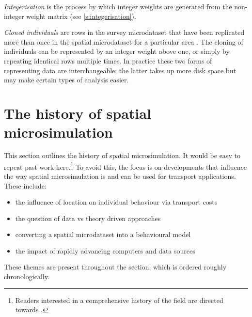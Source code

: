 \documentclass[a4paper, 11pt, twoside]{Thesis}
\begin{document}
\emph{Integerisation} is the process by which integer weights are generated
from the non-integer weight matrix (see \cref{s:integerisation}).

\emph{Cloned individuals}  are rows in the survey microdataset
that have been replicated more than once in the spatial microdataset for a
particular area \citep{Smith2009}.
The cloning of individuals can be represented by an integer
weight above one, or simply by repeating identical rows multiple times. In
practice these two forms of representing data are interchangeable; the latter
takes up more disk space \citep{Holm1996} but may make certain types of analysis
easier.


\section{The history of spatial microsimulation}
\label{s:history}
This section outlines the history of spatial microsimulation. It would
be easy to repeat past work here.\footnote{Readers interested in a
comprehensive history of the field are directed towards
\citet{Ballas2009-sage}.} To avoid this, the focus is on
developments that influence the way spatial microsimulation
is and can be used for transport applications. These include:
\begin{itemize}
 \item the influence of location on individual behaviour via
 transport costs 
 \item the question of data vs theory driven approaches
 \item converting a spatial microdataset into a behavioural model
 \item the impact of rapidly advancing computers and data sources
\end{itemize}
These themes are present throughout the section, which is ordered
roughly chronologically.
\end{document}
